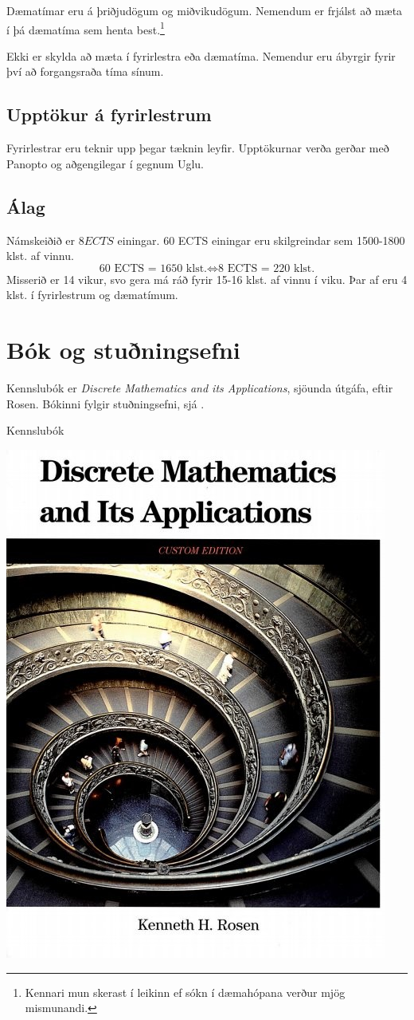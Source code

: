 \documentclass[justified, nobib]{tufte-handout}
\begin{document}
Dæmatímar eru á þriðjudögum og miðvikudögum. Nemendum er frjálst að mæta í þá dæmatíma sem henta best.\footnote{Kennari mun skerast í leikinn ef sókn í dæmahópana verður mjög mismunandi.}

Ekki er skylda að mæta í fyrirlestra eða dæmatíma. Nemendur eru ábyrgir fyrir því að forgangsraða tíma sínum.
\subsection{Upptökur á fyrirlestrum}
Fyrirlestrar eru teknir upp þegar tæknin leyfir.  Upptökurnar verða gerðar með Panopto og aðgengilegar í gegnum Uglu.
\subsection{Álag}
Námskeiðið er $8 ECTS$ einingar. 60 ECTS einingar eru skilgreindar sem 1500-1800 klst. af vinnu.
\[
    \text{60 ECTS = 1650 klst.} \Longleftrightarrow \text{8 ECTS = 220 klst.}
\]
Misserið er 14 vikur, svo gera má ráð fyrir 15-16 klst. af vinnu í viku. Þar af eru 4 klst. í fyrirlestrum og dæmatímum.
\section[Bók]{Bók og stuðningsefni}
\label{sec:book}
Kennslubók er \emph{Discrete Mathematics and its Applications}, sjöunda útgáfa, eftir Rosen. Bókinni fylgir stuðningsefni, sjá .

\begin{marginfigure}
    \caption{Kennslubók}
    \includegraphics[width=\linewidth]{Pics/rosen}
\end{marginfigure}
\end{document}
